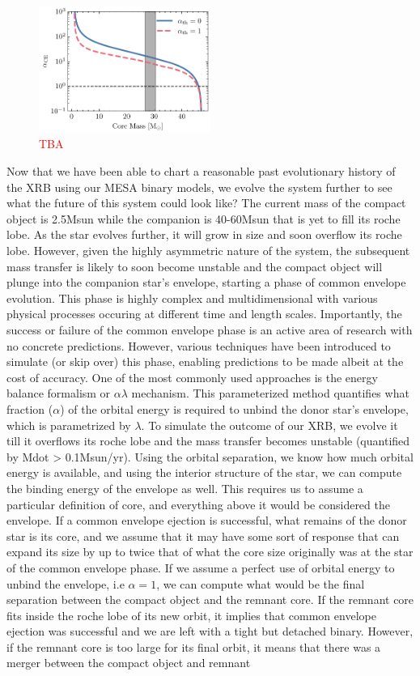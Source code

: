 \documentclass[linenumbers,trackchanges,twocolumn]{aastex701}
\newcommand{\red}{\textcolor{red}}
\begin{document}
\begin{figure}[htbp]
    \centering
    \includegraphics[width=0.5\textwidth]{xrb_alpha_ce.pdf}
    \caption{\red{TBA}}
    \label{fig:xrb_alpha_ce}
\end{figure}

Now that we have been able to chart a reasonable past evolutionary history of the XRB using our MESA binary models, we evolve the system further to see what the future of this system could look like? The current mass of the compact object is 2.5Msun while the companion is 40-60Msun that is yet to fill its roche lobe. As the star evolves further, it will grow in size and soon overflow its roche lobe. However, given the highly asymmetric nature of the system, the subsequent mass transfer is likely to soon become unstable and the compact object will plunge into the companion star's envelope, starting a phase of common envelope evolution. This phase is highly complex and multidimensional with various physical processes occuring at different time and length scales. Importantly, the success or failure of the common envelope phase is an active area of research with no concrete predictions. However, various techniques have been introduced to simulate (or skip over) this phase, enabling predictions to be made albeit at the cost of accuracy. One of the most commonly used approaches is the energy balance formalism or $\alpha \lambda$ mechanism. This parameterized method quantifies what fraction ($\alpha$) of the orbital energy is required to unbind the donor star's envelope, which is parametrized by $\lambda$. To simulate the outcome of our XRB, we evolve it till it overflows its roche lobe and the mass transfer becomes unstable (quantified by Mdot > 0.1Msun/yr). Using the orbital separation, we know how much orbital energy is available, and using the interior structure of the star, we can compute the binding energy of the envelope as well. This requires us to assume a particular definition of core, and everything above it would be considered the envelope. If a common envelope ejection is successful, what remains of the donor star is its core, and we assume that it may have some sort of response that can expand its size by up to twice that of what the core size originally was at the star of the common envelope phase. If we assume a perfect use of orbital energy to unbind the envelope, i.e $\alpha=1$, we can compute what would be the final separation between the compact object and the remnant core. If the remnant core fits inside the roche lobe of its new orbit, it implies that common envelope ejection was successful and we are left with a tight but detached binary. However, if the remnant core is too large for its final orbit, it means that there was a merger between the compact object and remnant 
\end{document}

